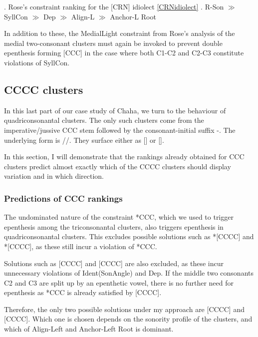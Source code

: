 \documentclass[12pt]{article}
\begin{document}
\ex. Rose's constraint ranking for the [CRN] idiolect \ref{CRNidiolect}
     \a. {\sc *R-Son} $\gg$ {\sc SyllCon} $\gg$ {\sc Dep} $\gg$ {\sc Align-L} $\gg$ {\sc Anchor-L Root}

In addition to these, the {\sc *MedialLight} constraint from Rose's analysis of the medial two-consonant clusters must again be invoked to prevent double epenthesis forming [CCC] in the case where both C1-C2 and C2-C3 constitute violations of {\sc SyllCon}.


\subsection{CCCC clusters}

In this last part of our case study of Chaha, we turn to the behaviour of quadriconsonantal clusters. The only such clusters come from the imperative/jussive CCC stem followed by the consonant-initial suffix -. The underlying form is //. They surface either as [] or [].

In this section, I will demonstrate that the rankings already obtained for CCC clusters predict almost exactly which of the CCCC clusters should display variation and in which direction.

\subsubsection{Predictions of CCC rankings}

The undominated nature of the constraint *CCC, which we used to trigger epenthesis among the triconsonantal clusters, also triggers epenthesis in quadriconsonantal clusters.
This excludes possible solutions such as *[CCCC] and *[CCCC], as these still incur a violation of *CCC.

Solutions such as [CCCC] and [CCCC] are also excluded, as these incur unnecessary violations of {\sc Ident(SonAngle)} and {\sc Dep}. If the middle two consonants C2 and C3 are split up by an epenthetic vowel, there is no further need for epenthesis as *CCC is already satisfied by [CCCC].

Therefore, the only two possible solutions under my approach are [CCCC] and [CCCC]. Which one is chosen depends on the sonority profile of the clusters, and which of {\sc Align-Left} and {\sc Anchor-Left Root} is dominant.
\end{document}
